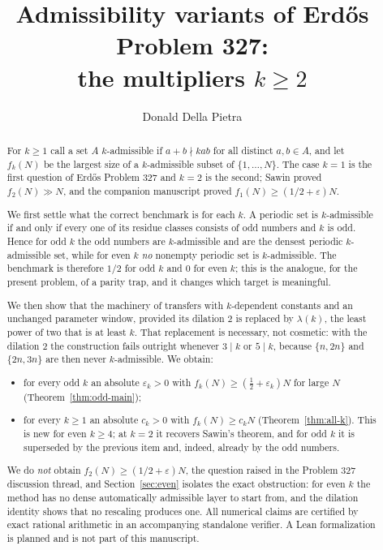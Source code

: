 \documentclass[11pt]{article}
\title{Admissibility variants of Erd\H{o}s Problem 327:\\
the multipliers \(k\geq2\)}
\author{Donald Della Pietra}
\date{}
\begin{document}
\maketitle

\begin{abstract}
For \(k\geq1\) call a set \(A\) \(k\)-admissible if \(a+b\nmid kab\) for all
distinct \(a,b\in A\), and let \(f_k(N)\) be the largest size of a
\(k\)-admissible subset of \(\{1,\ldots,N\}\). The case \(k=1\) is the first
question of Erd\H{o}s Problem 327 and \(k=2\) is the second; Sawin proved
\(f_2(N)\gg N\), and the companion manuscript \cite{DellaPietra2026} proved
\(f_1(N)\geq(1/2+\varepsilon)N\).

We first settle what the correct benchmark is for each \(k\). A periodic set
is \(k\)-admissible if and only if every one of its residue classes consists
of odd numbers and \(k\) is odd. Hence for odd \(k\) the odd numbers are
\(k\)-admissible and are the densest periodic \(k\)-admissible set, while for
even \(k\) \emph{no} nonempty periodic set is \(k\)-admissible. The benchmark
is therefore \(1/2\) for odd \(k\) and \(0\) for even \(k\); this is the
analogue, for the present problem, of a parity trap, and it changes which
target is meaningful.

We then show that the machinery of \cite{DellaPietra2026} transfers with
\(k\)-dependent constants and an unchanged parameter window, provided its
dilation \(2\) is replaced by \(\lambda(k)\), the least power of two that is at
least \(k\). That replacement is necessary, not cosmetic: with the dilation
\(2\) the construction fails outright whenever \(3\mid k\) or \(5\mid k\),
because \(\{n,2n\}\) and \(\{2n,3n\}\) are then never \(k\)-admissible. We
obtain:
\begin{itemize}
\item for every odd \(k\) an absolute \(\varepsilon_k>0\) with
      \(f_k(N)\geq(\tfrac12+\varepsilon_k)N\) for large \(N\)
      (Theorem~\ref{thm:odd-main});
\item for every \(k\geq1\) an absolute \(c_k>0\) with \(f_k(N)\geq c_kN\)
      (Theorem~\ref{thm:all-k}). This is new for even \(k\geq4\); at \(k=2\)
      it recovers Sawin's theorem, and for odd \(k\) it is superseded by the
      previous item and, indeed, already by the odd numbers.
\end{itemize}
We do \emph{not} obtain \(f_2(N)\geq(1/2+\varepsilon)N\), the question raised
in the Problem 327 discussion thread, and Section~\ref{sec:even} isolates the exact
obstruction: for even \(k\) the method has no dense automatically admissible
layer to start from, and the dilation identity shows that no rescaling
produces one. All numerical claims are certified by exact rational arithmetic
in an accompanying standalone verifier. A Lean formalization is planned and
is not part of this manuscript.
\end{abstract}
\end{document}
